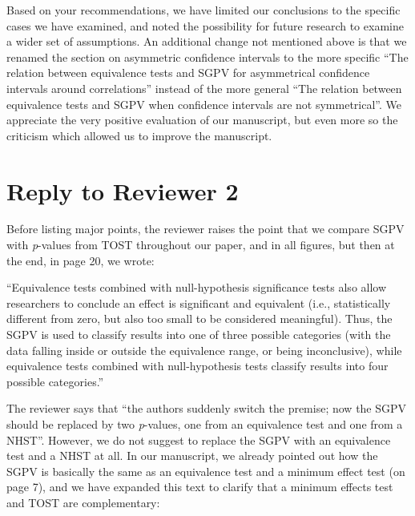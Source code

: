 \documentclass[man]{apa6}
\begin{document}
Based on your recommendations, we have limited our conclusions to the specific cases we have examined, and noted the possibility for future research to examine a wider set of assumptions. An additional change not mentioned above is that we renamed the section on asymmetric confidence intervals to the more specific \enquote{The relation between equivalence tests and SGPV for asymmetrical confidence intervals around correlations} instead of the more general \enquote{The relation between equivalence tests and SGPV when confidence intervals are not symmetrical}. We appreciate the very positive evaluation of our manuscript, but even more so the criticism which allowed us to improve the manuscript.

\hypertarget{reply-to-reviewer-2}{%
\section{Reply to Reviewer 2}\label{reply-to-reviewer-2}}

Before listing major points, the reviewer raises the point that we compare SGPV with \emph{p}-values from TOST throughout our paper, and in all figures, but then at the end, in page 20, we wrote:

\enquote{Equivalence tests combined with null-hypothesis significance tests also allow researchers to conclude an effect is significant and equivalent (i.e., statistically different from zero, but also too small to be considered meaningful). Thus, the SGPV is used to classify results into one of three possible categories (with the data falling inside or outside the equivalence range, or being inconclusive), while equivalence tests combined with null-hypothesis tests classify results into four possible categories.}

The reviewer says that \enquote{the authors suddenly switch the premise; now the SGPV should be replaced by two \emph{p}-values, one from an equivalence test and one from a NHST}. However, we do not suggest to replace the SGPV with an equivalence test and a NHST at all. In our manuscript, we already pointed out how the SGPV is basically the same as an equivalence test and a minimum effect test (on page 7), and we have expanded this text to clarify that a minimum effects test and TOST are complementary:
\end{document}

